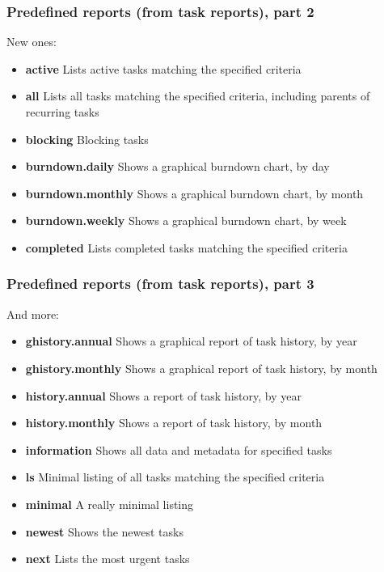 \documentclass[t,handout]{beamer}
\begin{document}
\begin{frame}[fragile]\frametitle{Predefined reports (from task reports), part 2}
    \vfill
    New ones:

    \begin{itemize}
        \item \textbf{active}           Lists active tasks matching the specified criteria
        \item \textbf{all}              Lists all tasks matching the specified criteria, including parents of recurring tasks
        \item \textbf{blocking}         Blocking tasks
        \item \textbf{burndown.daily}   Shows a graphical burndown chart, by day
        \item \textbf{burndown.monthly} Shows a graphical burndown chart, by month
        \item \textbf{burndown.weekly}  Shows a graphical burndown chart, by week
        \item \textbf{completed}        Lists completed tasks matching the specified criteria
    \end{itemize}
\end{frame}

\begin{frame}[fragile]\frametitle{Predefined reports (from task reports), part 3}
    \vfill
    And more:

    \begin{itemize}
        \item \textbf{ghistory.annual}  Shows a graphical report of task history, by year
        \item \textbf{ghistory.monthly} Shows a graphical report of task history, by month
        \item \textbf{history.annual}   Shows a report of task history, by year
        \item \textbf{history.monthly}  Shows a report of task history, by month
        \item \textbf{information}      Shows all data and metadata for specified tasks
        \item \textbf{ls}               Minimal listing of all tasks matching the specified criteria
        \item \textbf{minimal}          A really minimal listing
        \item \textbf{newest}           Shows the newest tasks
        \item \textbf{next}             Lists the most urgent tasks
    \end{itemize}
\end{frame}
\end{document}
